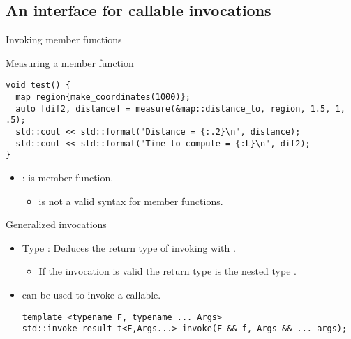 \subsection{An interface for callable invocations}

\begin{frame}[t,fragile]{Invoking member functions}
\begin{block}{Measuring a member function}
\begin{lstlisting}[escapechar=@]
void test() {
  map region{make_coordinates(1000)};                              
  auto [dif2, distance] = measure(&map::distance_to, region, 1.5, 1, .5);  
  std::cout << std::format("Distance = {:.2}\n", distance);
  std::cout << std::format("Time to compute = {:L}\n", dif2);
}
\end{lstlisting}
\end{block}
\begin{itemize}
  \item {}:  is member function.
    \begin{itemize}
      \item {} is not a valid syntax for member functions.
    \end{itemize}
\end{itemize}
\end{frame}

\begin{frame}[t,fragile]{Generalized invocations}
\begin{itemize}
  \item Type : 
        Deduces the return type of invoking  with .
    \begin{itemize}
      \item If the invocation is valid the return type is the
            nested type .
    \end{itemize}

  \item {} can be used to invoke a callable.
\begin{lstlisting}
template <typename F, typename ... Args>
std::invoke_result_t<F,Args...> invoke(F && f, Args && ... args);
\end{lstlisting}
\end{itemize}
\end{frame}

